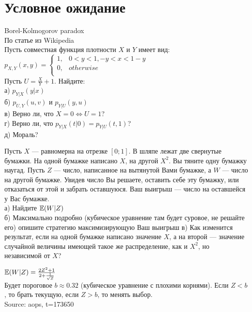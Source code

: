 \section{Условное ожидание}

\begin{problem}
 Borel-Kolmogorov paradox \\
По статье из Wikipedia \\
Пусть совместная функция плотности $X$ и $Y$ имеет вид: \\
$p_{X,Y}(x,y)=
\begin{cases}
  1, & 0<y<1, -y<x<1-y \\
  0, & otherwise \\
\end{cases}$ \\
Пусть $U=\frac{X}{Y}+1$. Найдите: \\
а) $p_{Y|X}(y|x)$ \\
б) $p_{U,Y}(u,v)$ и $p_{Y|U}(y,u)$ \\
в) Верно ли, что $X=0 \Leftrightarrow U=1$? \\
г) Верно ли, что $p_{Y|X}(t|0)=p_{Y|U}(t,1)$? \\
д) Мораль?

\begin{sol}

\end{sol}
\end{problem}

\begin{problem}
Пусть $X$ — равномерна на отрезке $[0;1]$. В шляпе лежат две свернутые бумажки. На одной бумажке написано $X$, на другой $X^{2}$. Вы тяните одну бумажку наугад. Пусть $Z$ — число, написанное на вытянутой Вами бумажке, а $W$ — число на другой бумажке. Увидев число Вы решаете, оставить себе эту бумажку, или отказаться от этой и забрать оставшуюся. Ваш выигрыш — число на оставшейся у Вас бумажке. \\
а) Найдите $\mathbb{E}(W|Z)$ \\
б) Максимально подробно (кубическое уравнение там будет суровое, не решайте его) опишите стратегию максимизирующую Ваш выигрыш
в) Как изменится результат, если на одной бумажке написано значение $ X $, а на второй — значение случайной величины имеющей такое же распределение, как и $ X^{2} $, но независимой от $ X $?



\begin{sol}

$\mathbb{E}(W|Z)=\frac{2Z^{2}+1}{2+\frac{1}{\sqrt{Z}}}$ \\
Будет пороговое $b\approx 0.32$ (кубическое уравнение с плохими корнями). Если $Z<b$, то брать текущую, если $Z>b$, то менять выбор. \\
Source: aops, t=173650
\end{sol}
\end{problem}

